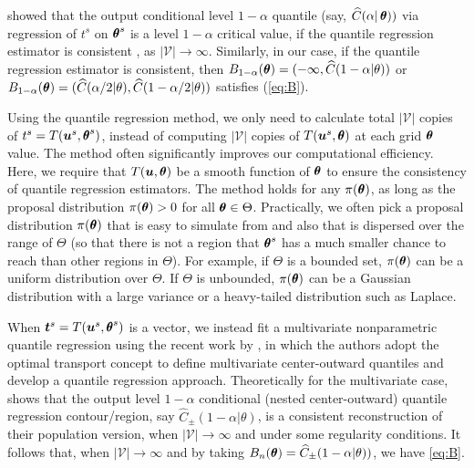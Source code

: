 \documentclass[12pt]{article}
\theoremstyle{shortspace}
\def\*#1{\bm{#1}}
\def\btheta{\mathop{\theta\kern-.45em\hbox{$\theta$}}\nolimits}
\begin{document}
\citet[][Theorems~1]{dalmasso2022} showed that the output conditional level $1 - \alpha$ quantile (say, $\widehat C(\alpha|\btheta))$ 
via regression of $t^s$ on $\btheta^s$ is a level $1 - \alpha$ critical value, if the quantile regression estimator is consistent 
\citep{koenker1994quantile,takeuchi2006nonparametric}, as $|{\mathcal V}| \to \infty$. Similarly, in our case,  if the quantile regression estimator is consistent, then $B_{1 -\alpha}(\btheta) = (- \infty, \widehat C(1-\alpha|\theta))$ or $B_{1 -\alpha}(\btheta) = (\widehat C(\alpha/2|\theta), \widehat C(1 - \alpha/2|\theta))$ satisfies (\ref{eq:B}). 





Using the quantile regression method, 
we only need to calculate total $|{\mathcal V}|$ copies of $t^s = T(\*u^s, {\btheta^s})$, instead of computing $|{\mathcal V}|$ copies of $T(\*u^s, {\btheta})$ at each grid $\btheta$ value.
The method often significantly improves our computational efficiency.
Here, we require that $T(\*u, {\btheta})$ be a smooth function of ${\btheta}$ to ensure the consistency of quantile regression estimators. 
The method holds for any $\pi(\btheta)$, as long as the proposal distribution $\pi(\btheta) > 0$ for all $\btheta \in \Theta$.
Practically, we often pick a proposal distribution $\pi(\btheta)$ that is easy to simulate from and also that is dispersed over the range of $\Theta$ (so that there is not a region that $\btheta^s$ has a much smaller chance to reach than other regions in $\Theta$). For example, 
if $\Theta$ is a bounded set, $\pi(\btheta)$ can be a uniform distribution over $\Theta$. If $\Theta$ is unbounded, $\pi(\btheta)$ can be a Gaussian distribution with a large variance or a heavy-tailed distribution such as Laplace.  


When $\*t^s = T(\*u^s, {\btheta}^s)$ is a vector, we instead fit a multivariate nonparametric quantile regression using  the recent work by  
\cite{delbarrio2022nonparametric}, in which the authors adopt the optimal transport concept to define multivariate center-outward quantiles and develop a quantile regression approach. 
Theoretically for the multivariate case, \citet[][Theorem 3.2]{delbarrio2022nonparametric} shows that the output level $1 - \alpha$
conditional (nested center-outward) quantile regression contour/region, say $\widehat C_{\pm}(1-\alpha|\theta)$,  is a  consistent reconstruction of their population version, when $|{\mathcal V}| \to \infty$ and under some regularity conditions. It follows that, when $|{\mathcal V}| \to \infty$ and by taking $B_n(\btheta) = \widehat C_{\pm}(1-\alpha|\theta))$, we have \eqref{eq:B}. 
\end{document}
